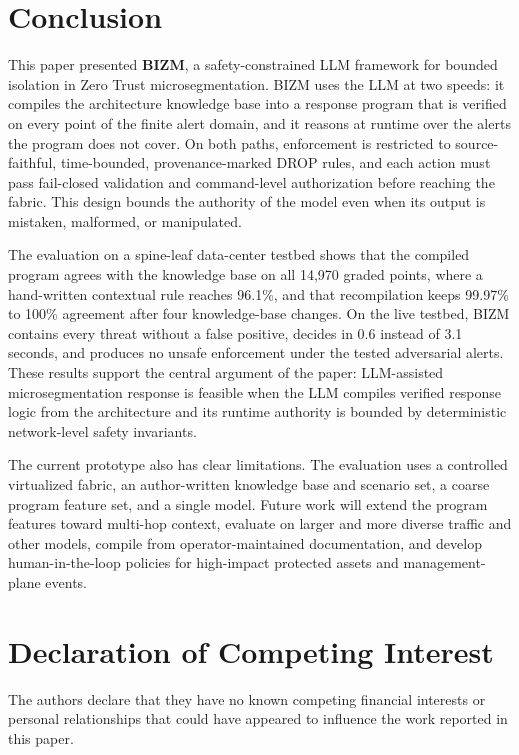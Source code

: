 \documentclass[final,5p]{elsarticle}
\begin{document}
\section{Conclusion}
\label{sec:conclusion}
This paper presented \textbf{BIZM}, a safety-constrained LLM framework for bounded isolation in Zero Trust microsegmentation. BIZM uses the LLM at two speeds: it compiles the architecture knowledge base into a response program that is verified on every point of the finite alert domain, and it reasons at runtime over the alerts the program does not cover. On both paths, enforcement is restricted to source-faithful, time-bounded, provenance-marked DROP rules, and each action must pass fail-closed validation and command-level authorization before reaching the fabric. This design bounds the authority of the model even when its output is mistaken, malformed, or manipulated.

The evaluation on a spine-leaf data-center testbed shows that the compiled program agrees with the knowledge base on all 14,970 graded points, where a hand-written contextual rule reaches 96.1\%, and that recompilation keeps 99.97\% to 100\% agreement after four knowledge-base changes. On the live testbed, BIZM contains every threat without a false positive, decides in 0.6 instead of 3.1 seconds, and produces no unsafe enforcement under the tested adversarial alerts. These results support the central argument of the paper: LLM-assisted microsegmentation response is feasible when the LLM compiles verified response logic from the architecture and its runtime authority is bounded by deterministic network-level safety invariants.

The current prototype also has clear limitations. The evaluation uses a controlled virtualized fabric, an author-written knowledge base and scenario set, a coarse program feature set, and a single model. Future work will extend the program features toward multi-hop context, evaluate on larger and more diverse traffic and other models, compile from operator-maintained documentation, and develop human-in-the-loop policies for high-impact protected assets and management-plane events.

\section*{Declaration of Competing Interest}
\noindent The authors declare that they have no known competing financial interests or personal relationships that could have appeared to influence the work reported in this paper.
\end{document}
